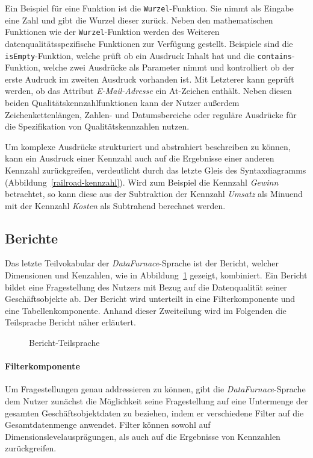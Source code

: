 \documentclass[
  language=german, %
  type=bachelor,%
  ngerman
]{isthesis}
\begin{document}
\begin{content}
  Ein Beispiel für eine Funktion ist die \texttt{Wurzel}-Funktion.  Sie nimmt
  als Eingabe eine Zahl und gibt die Wurzel dieser zurück. Neben den
  mathematischen Funktionen wie der \texttt{Wurzel}-Funktion werden des
  Weiteren datenqualitätsspezifische Funktionen zur Verfügung gestellt.
  Beispiele sind die \texttt{isEmpty}-Funktion, welche prüft ob ein Ausdruck
  Inhalt hat und die \texttt{contains}-Funktion, welche zwei Ausdrücke als
  Parameter nimmt und kontrolliert ob der erste Audruck im zweiten Ausdruck
  vorhanden ist. Mit Letzterer kann \zB{} geprüft werden, ob das Attribut
  \textit{E-Mail-Adresse} ein At-Zeichen enthält. Neben diesen beiden
  Qualitätskennzahlfunktionen kann der Nutzer außerdem Zeichenkettenlängen,
  Zahlen- und Datumsbereiche oder reguläre Ausdrücke für die Spezifikation
  von Qualitätskennzahlen nutzen.

  Um komplexe Ausdrücke strukturiert und abstrahiert beschreiben zu können,
  kann ein Ausdruck einer Kennzahl auch auf die Ergebnisse einer anderen
  Kennzahl zurückgreifen, verdeutlicht durch das letzte Gleis des
  Syntaxdiagramms (Abbildung~\ref{railroad-kennzahl}). Wird zum Beispiel die
  Kennzahl \textit{Gewinn} betrachtet, so kann diese aus der Subtraktion der
  Kennzahl \textit{Umsatz} als Minuend mit der Kennzahl \textit{Kosten} als
  Subtrahend berechnet werden.


  \subsection{Berichte}

  Das letzte Teilvokabular der \textit{DataFurnace}-Sprache ist der Bericht,
  welcher Dimensionen und Kenzahlen, wie in
  Abbildung~\ref{language_spec-erm-bericht} gezeigt, kombiniert. Ein Bericht
  bildet eine Fragestellung des Nutzers mit Bezug auf die Datenqualität seiner
  Geschäftsobjekte ab. Der Bericht wird unterteilt in eine Filterkomponente und
  eine Tabellenkomponente. Anhand dieser Zweiteilung wird im Folgenden die
  Teilsprache Bericht näher erläutert.

  \begin{figure}
    \resizebox{120px}{!}{}
    \caption{Bericht-Teilsprache}\label{language_spec-erm-bericht}
  \end{figure}
  
  \paragraph{Filterkomponente}\label{paragraph:filternde-komponente} Um
  Fragestellungen genau addressieren zu können, gibt die
  \textit{DataFurnace}-Sprache dem Nutzer zunächst die Möglichkeit seine
  Fragestellung auf eine Untermenge der gesamten Geschäftsobjektdaten zu
  beziehen, indem er verschiedene Filter auf die Gesamtdatenmenge anwendet.
  Filter können sowohl auf Dimensionslevelausprägungen, als auch auf die
  Ergebnisse von Kennzahlen zurückgreifen. 
  

\end{content}
\end{document}
